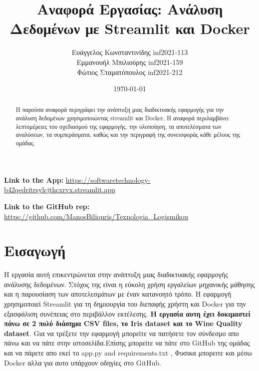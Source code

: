 \documentclass[a4paper,12pt]{article}
\title{Αναφορά Εργασίας: Ανάλυση Δεδομένων με \textlatin{Streamlit} και \textlatin{Docker}}
\author{Ευάγγελος Κωνσταντινίδης \textlatin{inf2021-113} \\
        Εμμανουήλ Μπιλιούρης \textlatin{inf2021-159} \\
        Φώτιος Σταματόπουλος \textlatin{inf2021-212}}
\date{\today}
\begin{document}

\maketitle

\begin{center}
    \textbf{\textlatin{Link to the App}:} \href{https://softwaretechnology-b42qedritrsylcjthcxrvx.streamlit.app}{\textlatin{https://softwaretechnology-b42qedritrsylcjthcxrvx.streamlit.app}}
\end{center}

\begin{center}
    \textbf{\textlatin{Link to the GitHub rep}:} \href{https://github.com/ManosBiliouris/Texnologia_Logismikou}{\textlatin{https://github.com/ManosBiliouris/Texnologia_Logismikou}}
\end{center}

\begin{abstract}
Η παρούσα αναφορά περιγράφει την ανάπτυξη μιας διαδικτυακής εφαρμογής για την ανάλυση δεδομένων χρησιμοποιώντας \textlatin{streamlit} και \textlatin{Docker}. Η αναφορά περιλαμβάνει λεπτομέρειες του σχεδιασμού της εφαρμογής, την υλοποίηση, τα αποτελέσματα των αναλύσεων, τα συμπεράσματα, καθώς και την περιγραφή της συνεισφοράς κάθε μέλους της ομάδας.
\end{abstract}

\tableofcontents
\newpage

\section{Εισαγωγή}
\label{sec:intro}
Η εργασία αυτή επικεντρώνεται στην ανάπτυξη μιας διαδικτυακής εφαρμογής ανάλυσης δεδομένων. Στόχος της είναι η εύκολη χρήση εργαλείων μηχανικής μάθησης και η παρουσίαση των αποτελεσμάτων με έναν κατανοητό τρόπο. Η εφαρμογή χρησιμοποιεί \textlatin{Streamlit} για τη δημιουργία του διεπαφής χρήστη και \textlatin{Docker} για την εξασφάλιση συνέπειας στο περιβάλλον εκτέλεσης. \textbf{Η εργασία αυτη έχει δοκιμαστεί πάνω σε 2 πολύ διάσημα \textlatin{CSV files}, το \textlatin{Iris dataset} και το \textlatin{Wine Quality dataset}}. Gια να τρέξετε την εφαρμογή μπορείτε να πατήσετε τον σύνδεσμο απο πάνω και να πάτε στην ιστοσελίδα.Επίσης μπορείτε να πάτε στο \textlatin{GitHub} της ομάδας και να πάρετε απο εκεί το \textlatin{app.py and requirements.txt} , Φυσικα μπορειτε και μέσω \textlatin{Docker} αλλα για αυτο υπάρχουν οδηγίες στο \textlatin{GitHub}.
\end{document}
